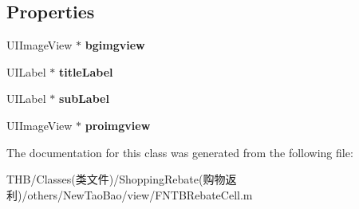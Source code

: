 \subsection*{Properties}
\begin{DoxyCompactItemize}
\item 
\mbox{\label{interface_f_n_t_b_rebate_cell_hot_element_view_a811572df2ec15f89cf65e7ab79f6cc3d}} 
U\+I\+Image\+View $\ast$ {\bfseries bgimgview}
\item 
\mbox{\label{interface_f_n_t_b_rebate_cell_hot_element_view_a6801be820718488a2d27835026f8805a}} 
U\+I\+Label $\ast$ {\bfseries title\+Label}
\item 
\mbox{\label{interface_f_n_t_b_rebate_cell_hot_element_view_ac7c137dc3921cf7e3149612322533714}} 
U\+I\+Label $\ast$ {\bfseries sub\+Label}
\item 
\mbox{\label{interface_f_n_t_b_rebate_cell_hot_element_view_a558777ac3553d6c83df1a65f0d1551a2}} 
U\+I\+Image\+View $\ast$ {\bfseries proimgview}
\end{DoxyCompactItemize}


The documentation for this class was generated from the following file\+:\begin{DoxyCompactItemize}
\item 
T\+H\+B/\+Classes(类文件)/\+Shopping\+Rebate(购物返利)/others/\+New\+Tao\+Bao/view/F\+N\+T\+B\+Rebate\+Cell.\+m\end{DoxyCompactItemize}
